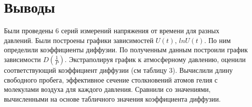 \documentclass[a4paper]{article}
\begin{document}
\section{Выводы}
Были проведены 6 серий измерений напряжения от времени для разных давлений. Были построены графики зависимостей $U(t)$, $lnU(t)$. По ним определили коэффициенты диффузии. По полученным данным построили график зависимости $D(\frac{1}{P})$. Экстраполируя график к атмосферному давлению, оценили соответствующий коэффициент диффузии (см таблицу 3). Вычислили длину свободного пробега,  эффективное сечение столкновений атомов гелия с молекулами воздуха для каждого давления. Сравнили со значениями, вычисленными на основе табличного значения коэффициента диффузии.
\end{document}
